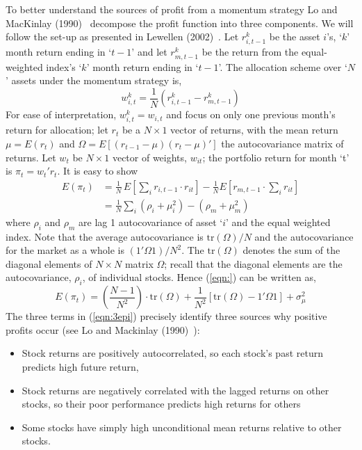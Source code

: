 To better understand the sources of profit from a momentum strategy Lo and MacKinlay (1990)~\cite{lo1990} decompose the profit function into three components. We will follow the set-up as presented in Lewellen (2002)~\cite{lew2002}. Let $r_{i,t-1}^k$ be the asset $i$'s, `$k$' month return ending in `$t-1$' and let $r_{m,t-1}^k$ be the return from the equal-weighted index's `$k$' month return ending in `$t-1$'. The allocation scheme over `$N$' assets under the momentum strategy is,
	\begin{equation}
	w_{i,t}^k= \frac{1}{N} (r_{i,t-1}^k - r_{m,t-1}^k)
	\end{equation}
For ease of interpretation, $w_{i,t}^k = w_{i,t}$ and focus on only one previous month's return for allocation; let $r_t$ be a $N \times 1$ vector of returns, with the mean return $\mu = E(r_t)$ and $\Omega = E[(r_{t-1} - \mu)(r_t - \mu)']$ the autocovariance matrix of returns. Let $w_t$ be $N \times 1$ vector of weights, $w_{it}$; the portfolio return for month `t' is $\pi_t = w_t'r_t$. It is easy to show
	\begin{equation}
	\begin{split}
	E(\pi_t)&= \frac{1}{N}\, E\left[\sum_i r_{i,t-1} \cdot r_{it} \right] - \frac{1}{N} E\left[r_{m,t-1} \cdot \sum_i r_{it} \right] \\
	&= \frac{1}{N}\sum_i (\rho_i + \mu_i^2) - (\rho_m + \mu_m^2)
	\end{split}
	\end{equation}
where $\rho_i$ and $\rho_m$ are lag 1 autocovariance of asset `$i$' and the equal weighted index. Note that the average autocovariance is $\text{tr}(\Omega)/N$ and the autocovariance for the market as a whole is $(1' \Omega 1)/N^2$. The $\text{tr}(\Omega)$ denotes the sum of the diagonal elements of $N \times N$ matrix $\Omega$; recall that the diagonal elements are the autocovariance, $\rho_i$, of individual stocks. Hence (\ref{eqn:}) can be written as,
	\begin{equation}\label{eqn:3epi}
	E(\pi_t) = \left(\frac{N-1}{N^2}\right)\cdot \text{tr}(\Omega) + \frac{1}{N^2} [\text{tr}(\Omega) - 1' \Omega 1] + \sigma_{\mu}^2
	\end{equation}
The three terms in (\ref{eqn:3epi}) precisely identify three sources why positive profits occur (see Lo and Mackinlay (1990)~\cite{lo1990}):
\begin{itemize}
\item Stock returns are positively autocorrelated, so each stock's past return predicts high future return,

\item Stock returns are negatively correlated with the lagged returns on other stocks, so their poor performance predicts high returns for others

\item Some stocks have simply high unconditional mean returns relative to other stocks.
\end{itemize}


